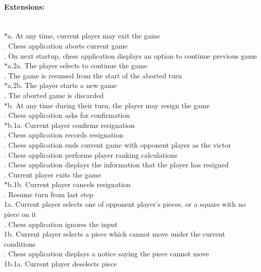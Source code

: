 \documentclass{article}
\begin{document}
\paragraph{Extensions:}\mbox{}\\
$*$a. At any time, current player may exit the game\\
. Chess application aborts current game\\
. On next startup, chess application displays an option to continue previous game\\
\indent\indent$*$a.2a. The player selects to continue the game\\
\indent\indent{}. The game is resumed from the start of the aborted turn\\
\indent\indent$*$a.2b. The player starts a new game\\
\indent\indent{}. The aborted game is discarded\\
\newpage
$*$b. At any time during their turn, the player may resign the game\\
. Chess application asks for confirmation\\
\indent\indent$*$b.1a. Current player confirms resignation\\
\indent\indent{}. Chess application records resignation\\
\indent\indent{}. Chess application ends current game with opponent player as the victor\\
\indent\indent{}. Chess application performs player ranking calculations\\
\indent\indent{}. Chess application displays the information that the player has resigned\\
\indent\indent{}. Current player exits the game\\
\indent\indent$*$b.1b. Current player cancels resignation\\
\indent\indent{}. Resume turn from last step\\
1a. Current player selects one of opponent player's pieces, or a square with no piece on it\\
. Chess application ignores the input\\
1b. Current player selects a piece which cannot move under the current conditions\\
. Chess application displays a notice saying the piece cannot move\\
\indent\indent1b.1a. Current player deselects piece\\
\end{document}
